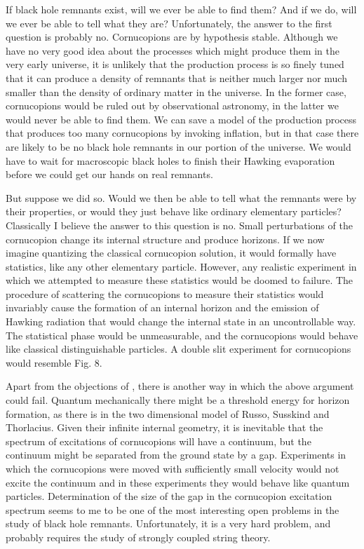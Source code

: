If black hole remnants exist, will we ever be able to find them?  And if we do,
will we ever be able to tell what they are?  Unfortunately, the answer to the
first question is probably no.  Cornucopions are by hypothesis stable.
Although we have no very good idea about the processes which might produce them
in the very early universe, it is unlikely that the production process is
so finely tuned that it can produce a density of remnants that is
neither much larger nor much smaller than the density of ordinary matter
in the universe.  In the former case, cornucopions would be ruled out
by observational astronomy, in the latter we would never be able to find them.
We can save a model of the production process that produces too many
cornucopions by invoking inflation, but in that case there are likely to be no
black hole remnants in our portion of the universe.  We would have to wait for
macroscopic black holes to finish their Hawking evaporation before we could
get our
hands on real remnants.

But suppose we did so.  Would we then be able to tell what the remnants were
by their properties, or would they just behave like ordinary elementary
particles?  Classically I believe the answer to this question is no.
Small perturbations of the cornucopion change its internal structure and
produce
horizons.
If we now imagine quantizing the classical cornucopion solution, it would
formally have
statistics, like any other elementary particle.  However, any realistic
experiment in which we attempted to measure these statistics would be doomed to
failure.  The procedure of scattering the cornucopions to measure their
statistics would
invariably cause the formation of an internal horizon and the emission of
Hawking radiation that would change the internal state in an uncontrollable
way.
The statistical phase would be unmeasurable, and the cornucopions would behave
like
classical distinguishable particles.  A double slit experiment for
cornucopions would resemble Fig. 8.

\ifig{}
{\epsfysize=6cm }

Apart from the objections of \horgidd , there is another way in which the
above argument
could fail.  Quantum mechanically there might be a threshold energy for
horizon formation,
as there is in the two dimensional model of Russo, Susskind and Thorlacius.
Given their infinite internal geometry, it is inevitable that the spectrum of
excitations
of cornucopions will have a continuum, but the continuum might be
separated from the ground state by a gap.  Experiments in which the
cornucopions were
moved with sufficiently small velocity would not excite the continuum
and in these experiments they would behave like quantum particles.
Determination of the size of the gap in the cornucopion excitation spectrum
seems to me to be one of the most interesting open problems in the study
of black hole remnants.  Unfortunately, it is a very hard problem, and
probably requires
the study of strongly coupled string theory.

